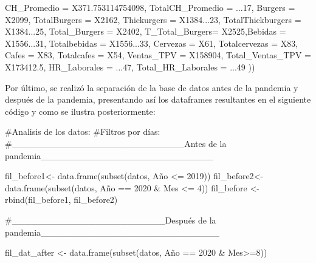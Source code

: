 \documentclass[
  us-letterpaper,
]{scrreprt}
\newenvironment{Shaded}{\begin{snugshade}}{\end{snugshade}}
\newcommand{\AttributeTok}[1]{\textcolor[rgb]{0.40,0.45,0.13}{#1}}
\newcommand{\CommentTok}[1]{\textcolor[rgb]{0.37,0.37,0.37}{#1}}
\newcommand{\DecValTok}[1]{\textcolor[rgb]{0.68,0.00,0.00}{#1}}
\newcommand{\FloatTok}[1]{\textcolor[rgb]{0.68,0.00,0.00}{#1}}
\newcommand{\FunctionTok}[1]{\textcolor[rgb]{0.28,0.35,0.67}{#1}}
\newcommand{\NormalTok}[1]{\textcolor[rgb]{0.00,0.23,0.31}{#1}}
\newcommand{\OtherTok}[1]{\textcolor[rgb]{0.00,0.23,0.31}{#1}}
\newcommand{\SpecialCharTok}[1]{\textcolor[rgb]{0.37,0.37,0.37}{#1}}
\theoremstyle{definition}
\theoremstyle{plain}
\theoremstyle{plain}
\theoremstyle{remark}
\begin{document}
\begin{Shaded}
\begin{Highlighting}[]
                  \AttributeTok{CH\_Promedio =}\NormalTok{ X371}\FloatTok{.753114754098}\NormalTok{, }
                  \AttributeTok{TotalCH\_Promedio =}\NormalTok{ ...}\DecValTok{17}\NormalTok{, }\AttributeTok{Burgers =}\NormalTok{ X2099,}
                  \AttributeTok{TotalBurgers =}\NormalTok{ X2162, }
                  \AttributeTok{Thickurgers =}\NormalTok{ X1384...}\DecValTok{23}\NormalTok{, }
                  \AttributeTok{TotalThickburgers =}\NormalTok{ X1384...}\DecValTok{25}\NormalTok{,}
                  \AttributeTok{Total\_Burgers =}\NormalTok{ X2402, }
                  \AttributeTok{T\_Total\_Burgers=}\NormalTok{ X2525,}\AttributeTok{Bebidas =}\NormalTok{ X1556...}\DecValTok{31}\NormalTok{,}
                  \AttributeTok{Totalbebidas =}\NormalTok{ X1556...}\DecValTok{33}\NormalTok{, }\AttributeTok{Cervezas =}\NormalTok{ X61,}
                  \AttributeTok{Totalcervezas =}\NormalTok{ X83, }\AttributeTok{Cafes =}\NormalTok{ X83,}
                  \AttributeTok{Totalcafes =}\NormalTok{ X54, }\AttributeTok{Ventas\_TPV =}\NormalTok{ X158904,}
                  \AttributeTok{Total\_Ventas\_TPV =}\NormalTok{ X173412}\FloatTok{.5}\NormalTok{,}
                  \AttributeTok{HR\_Laborales =}\NormalTok{ ...}\DecValTok{47}\NormalTok{,}
                  \AttributeTok{Total\_HR\_Laborales =}\NormalTok{ ...}\DecValTok{49}\NormalTok{ ))}
\end{Highlighting}
\end{Shaded}

Por último, se realizó la separación de la base de datos antes de la
pandemia y después de la pandemia, presentando así los dataframes
resultantes en el siguiente código y como se ilustra posteriormente:

\begin{Shaded}
\begin{Highlighting}[]
\CommentTok{\#Analisis de los datos:}
\CommentTok{\#Filtros por días:}
\CommentTok{\#\_\_\_\_\_\_\_\_\_\_\_\_\_\_\_\_\_\_\_\_\_\_\_\_\_\_\_Antes de la pandemia\_\_\_\_\_\_\_\_\_\_\_\_\_\_\_\_\_\_\_\_\_\_\_\_\_\_\_}

\NormalTok{fil\_before1}\OtherTok{\textless{}{-}} \FunctionTok{data.frame}\NormalTok{(}\FunctionTok{subset}\NormalTok{(datos, Año }\SpecialCharTok{\textless{}=} \DecValTok{2019}\NormalTok{))}
\NormalTok{fil\_before2}\OtherTok{\textless{}{-}} \FunctionTok{data.frame}\NormalTok{(}\FunctionTok{subset}\NormalTok{(datos, Año }\SpecialCharTok{==} \DecValTok{2020} \SpecialCharTok{\&}\NormalTok{ Mes }\SpecialCharTok{\textless{}=} \DecValTok{4}\NormalTok{))}
\NormalTok{fil\_before }\OtherTok{\textless{}{-}} \FunctionTok{rbind}\NormalTok{(fil\_before1, fil\_before2)}

\CommentTok{\#\_\_\_\_\_\_\_\_\_\_\_\_\_\_\_\_\_\_\_\_\_\_\_\_Después de la pandemia\_\_\_\_\_\_\_\_\_\_\_\_\_\_\_\_\_\_\_\_\_\_\_\_\_\_\_\_}

\NormalTok{fil\_dat\_after }\OtherTok{\textless{}{-}} \FunctionTok{data.frame}\NormalTok{(}\FunctionTok{subset}\NormalTok{(datos, Año }\SpecialCharTok{==} \DecValTok{2020} \SpecialCharTok{\&}\NormalTok{ Mes}\SpecialCharTok{\textgreater{}=}\DecValTok{8}\NormalTok{))}
\end{Highlighting}
\end{Shaded}
\end{document}
